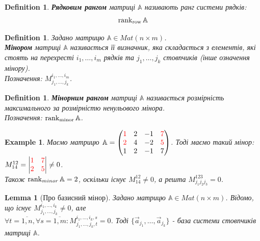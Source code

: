 \documentclass[a4paper, 10pt]{article}
\theoremstyle{theoremdd}
\theoremstyle{theoremdd}
\newtheorem{definition}[theorem]{Definition}
\theoremstyle{theoremdd}
\theoremstyle{theoremdd}
\newtheorem{example}[theorem]{Example}
\theoremstyle{theoremdd}
\theoremstyle{theoremdd}
\theoremstyle{theoremdd}
\newtheorem{lemma}[theorem]{Lemma}
\theoremstyle{theoremdd}
\begin{document}
\begin{definition}
\textbf{Рядковим рангом} матриці $\mathbb{A}$ називають ранг системи рядків:
\begin{align*}
\rank_{\textrm{row}} \mathbb{A}
\end{align*}
\end{definition}

\begin{definition}
Задано матрицю $\mathbb{A} \in Mat(n \times m)$.\\
\textbf{Мінором} матриці $\mathbb{A}$ називається її визначник, яка складається з елементів, які стоять на перехресті $i_1,\dots,i_m$ рядків та $j_1,\dots,j_k$ стовпчиків (інше означення мінору).\\
Позначення: $M_{j_1,\dots,j_k}^{i_1,\dots,i_m}$.
\end{definition}

\begin{definition}
\textbf{Мінорним рангом} матриці $\mathbb{A}$ називається розмірність максимального за розмірністю ненульового мінора.\\
Позначення: $\rank_{\textrm{minor}} \mathbb{A}$.
\end{definition}

\begin{example}
Маємо матрицю $\mathbb{A} = \begin{pmatrix}
\textcolor{red}{1} & 2 & -1 & \textcolor{red}{7} \\
\textcolor{red}{2} & 4 & -2 & \textcolor{red}{5} \\
1 & 2 & -1 & 7
\end{pmatrix}$. Тоді маємо такий мінор:\\
$M_{14}^{12} = \begin{vmatrix}
\textcolor{red}{1} & \textcolor{red}{7} \\
\textcolor{red}{2} & \textcolor{red}{5}
\end{vmatrix} \neq 0$.\\
Також $\rank_{minor} \mathbb{A} = 2$, оскільки існує $M_{14}^{12} \neq 0$, а решта $M^{123}_{j_1j_2j_3} = 0$.
\end{example}

\begin{lemma}[Про базисний мінор]
Задано матрицю $\mathbb{A} \in Mat(n \times m)$. Відомо, що існує $M_{j_1,\dots,j_k}^{i_1,\dots,i_k} \neq 0$, але \\ $\forall t = \overline{1,n}, \forall s = \overline{1,m}: M_{j_1,\dots,j_k,t}^{i_1,\dots,i_k,s} = 0$. Тоді $\{\vec{a}_{j_1},\dots,\vec{a}_{j_k}\}$ - база системи стовпчиків матриці $\mathbb{A}$.
\end{lemma}
\end{document}
